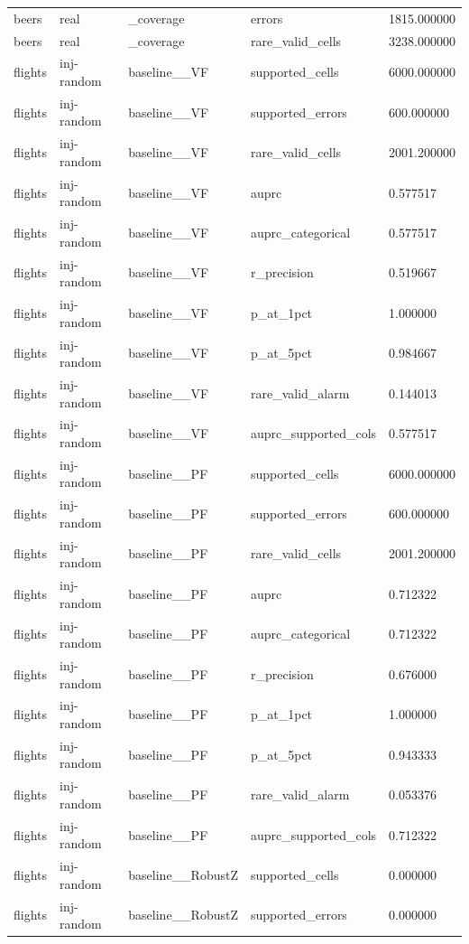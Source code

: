 \begin{tabular}{lllll}
beers & real & \_coverage & errors & 1815.000000 \\
beers & real & \_coverage & rare\_valid\_cells & 3238.000000 \\
flights & inj-random & baseline\_\_VF & supported\_cells & 6000.000000 \\
flights & inj-random & baseline\_\_VF & supported\_errors & 600.000000 \\
flights & inj-random & baseline\_\_VF & rare\_valid\_cells & 2001.200000 \\
flights & inj-random & baseline\_\_VF & auprc & 0.577517 \\
flights & inj-random & baseline\_\_VF & auprc\_categorical & 0.577517 \\
flights & inj-random & baseline\_\_VF & r\_precision & 0.519667 \\
flights & inj-random & baseline\_\_VF & p\_at\_1pct & 1.000000 \\
flights & inj-random & baseline\_\_VF & p\_at\_5pct & 0.984667 \\
flights & inj-random & baseline\_\_VF & rare\_valid\_alarm & 0.144013 \\
flights & inj-random & baseline\_\_VF & auprc\_supported\_cols & 0.577517 \\
flights & inj-random & baseline\_\_PF & supported\_cells & 6000.000000 \\
flights & inj-random & baseline\_\_PF & supported\_errors & 600.000000 \\
flights & inj-random & baseline\_\_PF & rare\_valid\_cells & 2001.200000 \\
flights & inj-random & baseline\_\_PF & auprc & 0.712322 \\
flights & inj-random & baseline\_\_PF & auprc\_categorical & 0.712322 \\
flights & inj-random & baseline\_\_PF & r\_precision & 0.676000 \\
flights & inj-random & baseline\_\_PF & p\_at\_1pct & 1.000000 \\
flights & inj-random & baseline\_\_PF & p\_at\_5pct & 0.943333 \\
flights & inj-random & baseline\_\_PF & rare\_valid\_alarm & 0.053376 \\
flights & inj-random & baseline\_\_PF & auprc\_supported\_cols & 0.712322 \\
flights & inj-random & baseline\_\_RobustZ & supported\_cells & 0.000000 \\
flights & inj-random & baseline\_\_RobustZ & supported\_errors & 0.000000 \\

\end{tabular}
